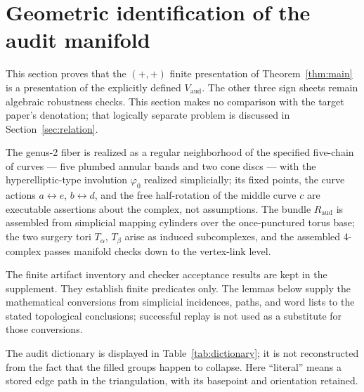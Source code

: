 \documentclass[11pt]{article}
\theoremstyle{definition}
\begin{document}
\section{Geometric identification of the audit manifold}
\label{sec:target}\label{sec:model}

This section proves that the $(+,+)$ finite presentation of
Theorem~\ref{thm:main} is a presentation of the explicitly defined
$V_{\mathrm{aud}}$.  The other three sign sheets remain algebraic robustness
checks.  This section makes no comparison with the target paper's
denotation; that logically separate problem is discussed in
Section~\ref{sec:relation}.

The genus-2 fiber is realized as a regular neighborhood of the specified
five-chain of curves --- five plumbed annular bands and two cone discs
--- with the hyperelliptic-type involution $\varphi_0$ realized
simplicially; its fixed points, the curve actions $a\leftrightarrow e$,
$b\leftrightarrow d$, and the free half-rotation of the middle curve $c$
are executable assertions about the complex, not assumptions. The bundle
$R_{\mathrm{aud}}$ is assembled from simplicial mapping cylinders over the once-punctured
torus base; the two surgery tori $T_\alpha$, $T_\beta$ arise as induced
subcomplexes, and the assembled 4-complex passes manifold checks down to
the vertex-link level.

The finite artifact inventory and checker acceptance results are kept in the
supplement.  They establish finite predicates only.  The lemmas below supply
the mathematical conversions from simplicial incidences, paths, and word
lists to the stated topological conclusions; successful replay is not used as
a substitute for those conversions.

The audit dictionary is displayed in Table~\ref{tab:dictionary}; it is not
reconstructed from the fact that the filled groups happen to collapse.
Here ``literal'' means a stored edge path in the triangulation, with its
basepoint and orientation retained.
\end{document}
